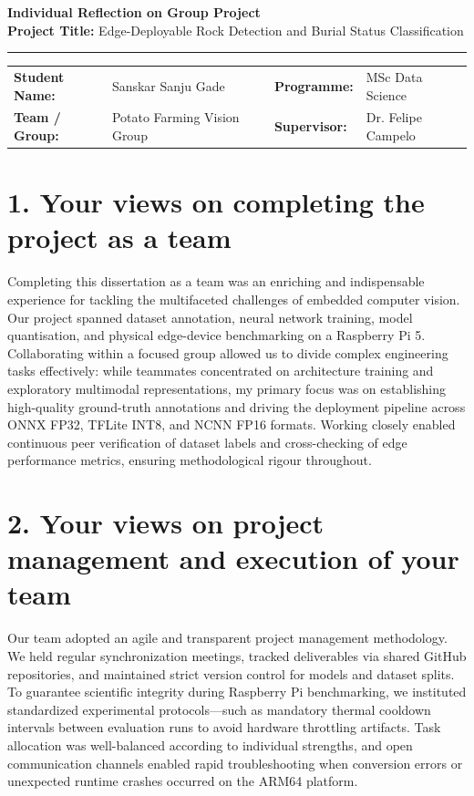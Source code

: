 \documentclass[11pt, a4paper]{article}
\begin{document}
\begin{center}
    {\Large \bfseries Individual Reflection on Group Project} \\[0.3em]
    {\small \textbf{Project Title:} Edge-Deployable Rock Detection and Burial Status Classification} \\[0.2em]
    \rule{\textwidth}{1pt}
\end{center}

\vspace{-0.5em}
\noindent
\begin{tabular}{@{}ll p{2cm} ll@{}}
    \textbf{Student Name:} & Sanskar Sanju Gade & & \textbf{Programme:} & MSc Data Science \\
    \textbf{Team / Group:} & Potato Farming Vision Group & & \textbf{Supervisor:} & Dr. Felipe Campelo \\
\end{tabular}

\vspace{0.2em}

\section*{1. Your views on completing the project as a team}
Completing this dissertation as a team was an enriching and indispensable experience for tackling the multifaceted challenges of embedded computer vision. Our project spanned dataset annotation, neural network training, model quantisation, and physical edge-device benchmarking on a Raspberry Pi 5. Collaborating within a focused group allowed us to divide complex engineering tasks effectively: while teammates concentrated on architecture training and exploratory multimodal representations, my primary focus was on establishing high-quality ground-truth annotations and driving the deployment pipeline across ONNX FP32, TFLite INT8, and NCNN FP16 formats. Working closely enabled continuous peer verification of dataset labels and cross-checking of edge performance metrics, ensuring methodological rigour throughout.

\section*{2. Your views on project management and execution of your team}
Our team adopted an agile and transparent project management methodology. We held regular synchronization meetings, tracked deliverables via shared GitHub repositories, and maintained strict version control for models and dataset splits. To guarantee scientific integrity during Raspberry Pi benchmarking, we instituted standardized experimental protocols---such as mandatory thermal cooldown intervals between evaluation runs to avoid hardware throttling artifacts. Task allocation was well-balanced according to individual strengths, and open communication channels enabled rapid troubleshooting when conversion errors or unexpected runtime crashes occurred on the ARM64 platform.
\end{document}
